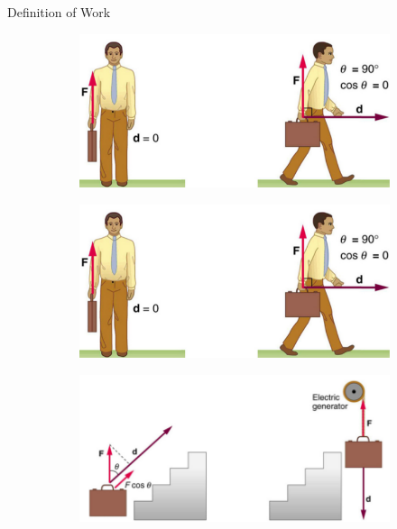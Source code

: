 \documentclass{beamer}
\begin{document}
\begin{frame}{Definition of Work}
\begin{figure}
\centering
\begin{subfigure}{0.12\textwidth}
\centering
\includegraphics[width=\textwidth,trim=0cm 0cm 15cm 0cm,clip=true]{figures/lawn2.png}
\caption{}
\end{subfigure}
\begin{subfigure}{0.18\textwidth}
\centering
\includegraphics[width=\textwidth,trim=12cm 0cm 0cm 0cm,clip=true]{figures/lawn2.png}
\caption{}
\end{subfigure}
\begin{subfigure}{0.43\textwidth}
\centering
\includegraphics[width=\textwidth]{figures/lawn3.png}

\end{subfigure}
\end{figure}
\end{frame}
\end{document}
